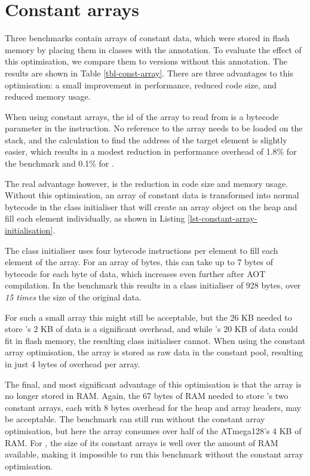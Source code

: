 \section{Constant arrays}
\label{sec-evaluation-const-array}


Three benchmarks contain arrays of constant data, which were stored in flash memory by placing them in classes with the  annotation. To evaluate the effect of this optimisation, we compare them to versions without this annotation. The results are shown in Table \ref{tbl-const-array}. There are three advantages to this optimisation: a small improvement in performance, reduced code size, and reduced memory usage.

When using constant arrays, the id of the array to read from is a bytecode parameter in the  instruction. No reference to the array needs to be loaded on the stack, and the calculation to find the address of the target element is slightly easier, which results in a modest reduction in performance overhead of 1.8\% for the  benchmark and 0.1\% for .

The real advantage however, is the reduction in code size and memory usage. Without this optimisation, an array of constant data is transformed into normal bytecode in the class initialiser that will create an array object on the heap and fill each element individually, as shown in Listing \ref{lst-constant-array-initialisation}.

The class initialiser uses four bytecode instructions per element to fill each element of the array. For an array of bytes, this can take up to 7 bytes of bytecode for each byte of data, which increases even further after AOT compilation. In the  benchmark this results in a class initialiser of 928 bytes, over \emph{15 times} the size of the original data. 

For such a small array this might still be acceptable, but the 26 KB needed to store 's 2 KB of data is a significant overhead, and while 's 20 KB of data could fit in flash memory, the resulting class initialiser cannot. When using the constant array optimisation, the array is stored as raw data in the constant pool, resulting in just 4 bytes of overhead per array.

The final, and most significant advantage of this optimisation is that the array is no longer stored in RAM. Again, the 67 bytes of RAM needed to store 's two constant arrays, each with 8 bytes overhead for the heap and array headers, may be acceptable. The  benchmark can still run without the constant array optimisation, but here the array consumes over half of the ATmega128's 4 KB of RAM. For , the size of its constant arrays is well over the amount of RAM available, making it impossible to run this benchmark without the constant array optimisation.